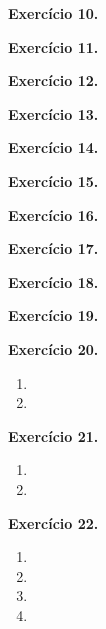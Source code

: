 \documentclass[12pt,a4paper]{article}
\begin{document}
\vspace{0.5cm}
\noindent\textbf{Exercício 10.}

\vspace{0.5cm}
\noindent\textbf{Exercício 11.}

\vspace{0.5cm}
\noindent\textbf{Exercício 12.}

\vspace{0.5cm}
\noindent\textbf{Exercício 13.}

\vspace{0.5cm}
\noindent\textbf{Exercício 14.}

\vspace{0.5cm}
\noindent\textbf{Exercício 15.}

\vspace{0.5cm}
\noindent\textbf{Exercício 16.}

\vspace{0.5cm}
\noindent\textbf{Exercício 17.}

\vspace{0.5cm}
\noindent\textbf{Exercício 18.}

\vspace{0.5cm}
\noindent\textbf{Exercício 19.}

\vspace{0.5cm}
\noindent\textbf{Exercício 20.}
\begin{enumerate}
    \renewcommand{\theenumi}{\alph{enumi}}
    \renewcommand{\labelenumi}{\theenumi)}
    \item 
    \item 
\end{enumerate}

\vspace{0.5cm}
\noindent\textbf{Exercício 21.}
\begin{enumerate}
    \renewcommand{\theenumi}{\alph{enumi}}
    \renewcommand{\labelenumi}{\theenumi)}
    \item 
    \item 
\end{enumerate}

\vspace{0.5cm}
\noindent\textbf{Exercício 22.}
\begin{enumerate}
    \renewcommand{\theenumi}{\alph{enumi}}
    \renewcommand{\labelenumi}{\theenumi)}
    \item 
    \item 
    \item 
    \item 
\end{enumerate}
\end{document}
